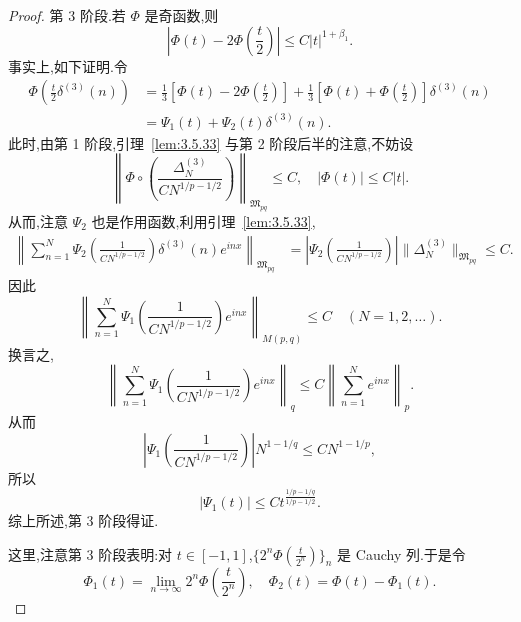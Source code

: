 \begin{proof}
第 3 阶段.若 $\Phi$ 是奇函数,则
\begin{equation*}
\left|\Phi(t) - 2\Phi\left(\frac{t}{2}\right)\right| \leq C|t|^{1 + \beta_{1}}.
\end{equation*}
事实上,如下证明.令
\begin{align*}
\Phi\left(\frac{t}{2}\delta^{(3)}(n)\right) &= \frac{1}{3}\left[\Phi(t) - 2\Phi\left(\frac{t}{2}\right)\right] + \frac{1}{3}\left[\Phi(t) + \Phi\left(\frac{t}{2}\right)\right]\delta^{(3)}(n)\\
&= \Psi_{1}(t) + \Psi_{2}(t)\delta^{(3)}(n).
\end{align*}
此时,由第 1 阶段,引理~\ref{lem:3.5.33} 与第 2 阶段后半的注意,不妨设
\begin{equation*}
\left\|\Phi \circ \left(\frac{\Delta_{N}^{(3)}}{C N^{1/p - 1/2}}\right)\right\|_{\mathfrak{M}_{pq}} \leq C, \quad |\Phi(t)| \leq C|t|.
\end{equation*}
从而,注意 $\Psi_{2}$ 也是作用函数,利用引理~\ref{lem:3.5.33},
\begin{equation*}
\begin{aligned}
\left\|\sum_{n=1}^{N}\Psi_{2}\left(\frac{1}{C N^{1/p - 1/2}}\right)\delta^{(3)}(n)e^{inx}\right\|_{\mathfrak{M}_{pq}} &= \left|\Psi_{2}\left(\frac{1}{C N^{1/p - 1/2}}\right)\right|\|\Delta_{N}^{(3)}\|_{\mathfrak{M}_{pq}} \leq C.
\end{aligned}
\end{equation*}
因此
\begin{equation*}
\left\|\sum_{n=1}^{N}\Psi_{1}\left(\frac{1}{C N^{1/p - 1/2}}\right)e^{inx}\right\|_{M(p,q)} \leq C \quad (N = 1, 2, \ldots).
\end{equation*}
换言之,
\begin{equation*}
\left\|\sum_{n=1}^{N}\Psi_{1}\left(\frac{1}{C N^{1/p - 1/2}}\right)e^{inx}\right\|_{q} \leq C\left\|\sum_{n=1}^{N}e^{inx}\right\|_{p}.
\end{equation*}
从而
\begin{equation*}
\left|\Psi_{1}\left(\frac{1}{C N^{1/p - 1/2}}\right)\right|N^{1 - 1/q} \leq C N^{1 - 1/p},
\end{equation*}
所以
\begin{equation*}
|\Psi_{1}(t)| \leq C t^{\frac{1/p - 1/q}{1/p - 1/2}}.
\end{equation*}
综上所述,第 3 阶段得证.

这里,注意第 3 阶段表明:对 $t \in [-1, 1]$,$\{2^{n}\Phi\left(\frac{t}{2^{n}}\right)\}_{n}$ 是 Cauchy 列.于是令
\begin{equation*}
\Phi_{1}(t) = \lim_{n \to \infty}2^{n}\Phi\left(\frac{t}{2^{n}}\right), \quad \Phi_{2}(t) = \Phi(t) - \Phi_{1}(t).
\end{equation*}


\end{proof}
